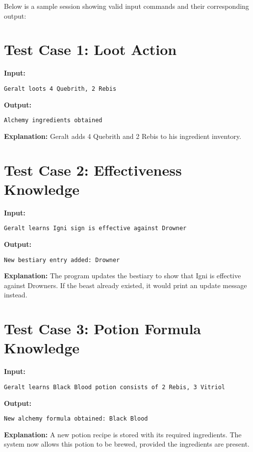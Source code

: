 \documentclass{article}
\begin{document}
Below is a sample session showing valid input commands and their corresponding output:

\section*{Test Case 1: Loot Action}

\textbf{Input:}
\begin{lstlisting}
Geralt loots 4 Quebrith, 2 Rebis
\end{lstlisting}

\textbf{Output:}
\begin{lstlisting}
Alchemy ingredients obtained
\end{lstlisting}

\textbf{Explanation:} Geralt adds 4 Quebrith and 2 Rebis to his ingredient inventory.

\section*{Test Case 2: Effectiveness Knowledge}

\textbf{Input:}
\begin{lstlisting}
Geralt learns Igni sign is effective against Drowner
\end{lstlisting}

\textbf{Output:}
\begin{lstlisting}
New bestiary entry added: Drowner
\end{lstlisting}

\textbf{Explanation:} The program updates the bestiary to show that Igni is effective against Drowners. If the beast already existed, it would print an update message instead.

\section*{Test Case 3: Potion Formula Knowledge}

\textbf{Input:}
\begin{lstlisting}
Geralt learns Black Blood potion consists of 2 Rebis, 3 Vitriol
\end{lstlisting}

\textbf{Output:}
\begin{lstlisting}
New alchemy formula obtained: Black Blood
\end{lstlisting}

\textbf{Explanation:} A new potion recipe is stored with its required ingredients. The system now allows this potion to be brewed, provided the ingredients are present.
\end{document}
